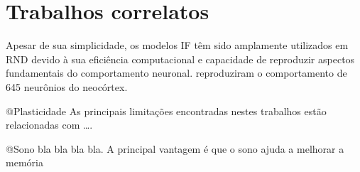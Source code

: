 \chapter{Trabalhos correlatos}


Apesar de sua simplicidade, os modelos IF têm sido amplamente utilizados em RND devido à sua eficiência computacional e capacidade
de reproduzir aspectos fundamentais do comportamento neuronal. \cite{teeterGeneralized2018} reproduziram o comportamento de 645
neurônios do neocórtex.
\cite{gerstnerHow2009}

@Plasticidade As principais limitações encontradas nestes trabalhos estão relacionadas com ….


@Sono bla bla bla bla. A principal vantagem é que o sono ajuda a melhorar a memória
